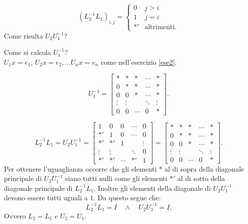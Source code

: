 \begin{dimo}
\[
(L_2^{-1}L_1)_{i,j} = \left\{\begin{array}{lr}
0  & j > i \\
1  & j = i \\
*' & \textrm{altrimenti.}
\end{array}\right.
\]
Come risulta $U_2U_1^{-1}$?
\begin{flushleft}
Come si calcola $U_1^{-1}$?\\
$U_1x = e_1$, $U_2x = e_2, \ldots U_nx = e_n$ come nell'esercizio \ref{ese2}.
\end{flushleft}
\[
U_1^{-1}=
\left[
\begin{array}{ccccc}
*      & *      & *      & \cdots & * \\
0      & *      & *      & \cdots & * \\
0      & 0      & *      & \cdots & * \\
\vdots & \vdots &        & \ddots & \vdots  \\
0      & 0      & \cdots & 0      & *
\end{array} \right].
\]

\[L_2^{-1}L_1 = U_2U_1^{-1} =
\left[
\begin{array}{ccccc}
1      & 0      & 0      & \cdots & 0 \\
*'      & 1      & 0      & \cdots & 0 \\
*'      & *'      & 1      &        & \vdots \\
\vdots & \vdots &        & \ddots & 0  \\
*'      & *'      & \cdots & *'      & 1
\end{array} \right] =
\left[
\begin{array}{ccccc}
*      & *      & *      & \cdots & * \\
0      & *      & *      & \cdots & * \\
0      & 0      & *      & \cdots & * \\
\vdots & \vdots &        & \ddots & \vdots  \\
0      & 0      & \cdots & 0      & *
\end{array} \right].
\]
Per ottenere l'uguaglianza occorre che gli elementi $*$ al di sopra della
diagonale principale di $U_2U_1^{-1}$ siano tutti nulli come gli elementi $*'$
al di sotto della diagonale principale di $L_2^{-1}L_1$.
Inoltre gli elementi della diagonale di $U_2U_1^{-1}$ devono essere tutti uguali
a $1$. Da questo segue che:
\[L_2^{-1}L_1 = I \quad \wedge \quad U_2U_1^{-1} = I.\]
Ovvero $L_2 = L_1$ e $U_2 = U_1$.
\end{dimo}


